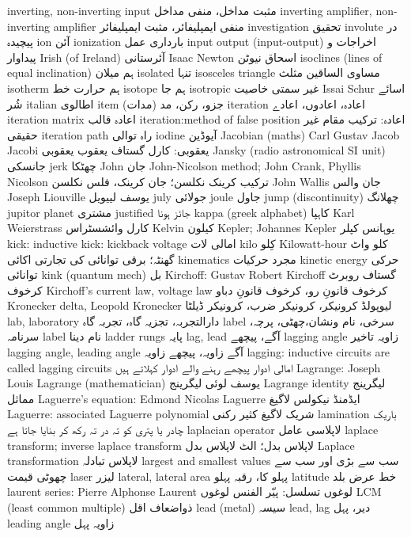 inverting, non-inverting input	مثبت مداخل، منفی مداخل
inverting amplifier, non-inverting amplifier	منفی ایمپلیفائر، مثبت ایمپلیفائر
investigation	تحقیق
involute	در پیچیدہ
ion	آئن
ionization	بارداری عمل
input output (input-output)	اخراجات و پیداوار
Irish (of Ireland)	آئرستانی
Isaac Newton	اسحاق نیوٹن
isoclines (lines of equal inclination)	ہم میلان
isolated	تنہا
isosceles triangle	مساوی الساقین مثلث
isotherm	ہم حرارت خط
isotope	ہم جا
isotropic	غیر سمتی خاصیت
Issai Schur	اسائے شُر
italian	اطالوی
item	جزو، رکن، مد (مدات)
iteration	اعادہ، اعادوں، اعادے
iteration matrix	اعادہ قالب
iteration:method of false position	اعادہ: ترکیب مقام غیر حقیقی
iteration path	راہ توالی
iodine	آیوڈین
Jacobian (maths) Carl Gustav Jacob Jacobi	یعقوبی: کارل گستاف یعقوب یعقوبی
Jansky (radio astronomical SI unit)	جانسکی
jerk	چھٹکا
John	جان
John-Nicolson method; John Crank, Phyllis Nicolson	ترکیب کرینک نکلسن؛ جان کرینک، فلس نکلسن
John Wallis	جان والس
Joseph Liouville	یوسف لییویل
july	جولائی
joule	جاول
jump (discontinuity)	چھلانگ
jupitor planet	مشتری
justified	جائز ہونا
kappa (greek alphabet)	کاہپا
Karl Weierstrass	کارل وائشسٹراس
Kelvin	کیلون
Kepler; Johannes Kepler	یوہانس کپلر
kick: inductive kick: kickback voltage	امالی لات
kilo	کِلو
Kilowatt-hour	کلو واٹ گھنٹہ؛ برقی توانائی کی تجارتی اکائی
kinematics	مجرد حرکیات
kinetic energy	حرکی توانائی
kink (quantum mech)	بل
Kirchoff: Gustav Robert Kirchoff	گستاف روبرٹ کرخوف
Kirchoff's current law, voltage law	کرخوف قانونِ رو، کرخوف قانونِ دباو
Kronecker delta, Leopold Kronecker	لیوپولڈ کرونیکر، کرونیکر ضرب، کرونیکر ڈیلٹا
lab, laboratory	دارالتجربہ، تجزیہ گاہ، تجربہ گاہ
label	سرخی، نام ونشان،چھٹی، پرچہ، سرنامہ
label	نام دینا
ladder rungs	پایہ
lag, lead	آگے، پیچھے
lagging angle	زاویہ تاخیر
lagging angle, leading angle	آگے زاویہ، پیچھے زاویہ
lagging: inductive circuits are called lagging circuits	امالی ادوار پیچھے رہنے والے ادوار کہلاتے ہیں
Lagrange: Joseph Louis Lagrange (mathematician)	یوسف لوئی لیگرینج
Lagrange identity	لیگرینج مماثل
Laguerre's equation: Edmond Nicolas Laguerre	ایڈمنڈ نیکولس لاگیغ
Laguerre: associated Laguerre polynomial	شریک لاگیغ کثیر رکنی
lamination	باریک چادر یا پتری کو تہ در تہ رکھ کر بنایا جاتا ہے
laplacian operator	لاپلاسی عامل
laplace transform; inverse laplace transform	لاپلاس بدل؛ الٹ لاپلاس بدل
Laplace transformation	لاپلاس تبادلہ
largest and smallest values	سب سے بڑی اور سب سے چھوٹی قیمت
laser	لیزر
lateral, lateral area	پہلو کا، رقبہ پہلو
latitude	خط عرض بلد
laurent series: Pierre Alphonse Laurent	لوغوں تسلسل: پیّر الفنس لوغوں
LCM (least common multiple)	ذواضعاف اقل
lead (metal)	سیسہ
lead, lag	دیر، پہل
leading angle	زاویہ پہل
